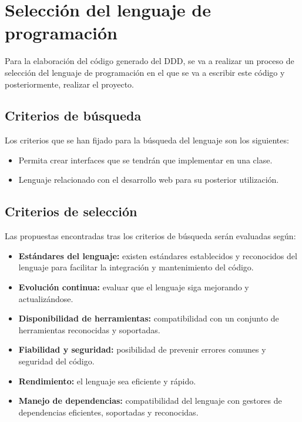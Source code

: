 \section{Selección del lenguaje de programación}

Para la elaboración del código generado del DDD, se va a realizar un proceso de selección del lenguaje de programación en el que se va a escribir este código y posteriormente, realizar el proyecto.

\subsection{Criterios de búsqueda}

Los criterios que se han fijado para la búsqueda del lenguaje son los siguientes:

\begin{itemize}
    \item Permita crear interfaces que se tendrán que implementar en una clase.
    \item Lenguaje relacionado con el desarrollo web para su posterior utilización.
\end{itemize}

\subsection{Criterios de selección}

Las propuestas encontradas tras los criterios de búsqueda serán evaluadas según:

\begin{itemize}
    \item \textbf{Estándares del lenguaje:} existen estándares establecidos y reconocidos del lenguaje para facilitar la integración y mantenimiento del código.
    \item \textbf{Evolución continua:} evaluar que el lenguaje siga mejorando y actualizándose.
    \item \textbf{Disponibilidad de herramientas:} compatibilidad con un conjunto de herramientas reconocidas y soportadas.
    \item \textbf{Fiabilidad y seguridad:} posibilidad de prevenir errores comunes y seguridad del código.
    \item \textbf{Rendimiento:} el lenguaje sea eficiente y rápido.
    \item \textbf{Manejo de dependencias:} compatibilidad del lenguaje con gestores de dependencias eficientes, soportadas y reconocidas.
\end{itemize}


